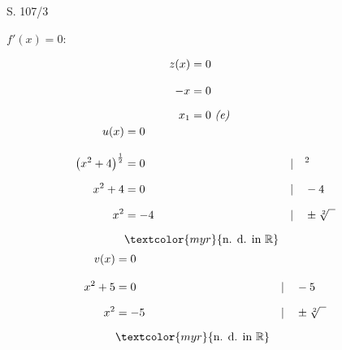 \begin{Exercise}{S. 107/3}{}
\begin{enumerate}
\begin{enumerate}[label=\alph*),leftmargin=*]
{\begin{itemize}[leftmargin=*]
{                    $f'(x) = 0:$\\
                    \begin{minipage}[t]{0.20\linewidth}
                        \vspace{-2.0ex}
                        \begin{align*}
                            z(x) &= 0 \\[2.0ex]
                            -x &= 0 &&\\[1.5ex]
                            x_{1} &= 0 \ \text{\textit{(e)}}&&\\[-2.0ex]
                        \end{align*}
                    \end{minipage}
                    \hfill
                    \begin{minipage}[t]{0.35\linewidth}
                        \vspace{-2.0ex}
                        \begin{align*}
                            u(x) &= 0 \\[2.0ex]
                            \left(x^{2} + 4\right)^{\frac{1}{2}} &= 0 &&| \quad ^{2}\\[1.5ex]
                            x^{2} + 4 &= 0 &&| \quad - 4\\[1.5ex]
                            x^{2} &= -4 &&| \quad \pm \sqrt[2]{\phantom{x}}\\[1.5ex]
                            & \textcolor{myr}{\text{n. d. in } \mathbb{R}}\\[-1.5ex]
                        \end{align*}
                    \end{minipage}
                    \hfill
                    \begin{minipage}[t]{0.25\linewidth}
                        \vspace{-2.0ex}
                        \begin{align*}
                            v(x) &= 0 \\[2.0ex]
                            x^{2} + 5 &= 0 &&| \quad -5\\[1.5ex]
                            x^{2} &= -5 &&| \quad \pm \sqrt[2]{\phantom{x}}\\[1.5ex]
                            & \textcolor{myr}{\text{n. d. in } \mathbb{R}}\\[-1.5ex]
                        \end{align*}
                    \end{minipage}
}
\end{itemize}}
\end{enumerate}
\end{enumerate}
\end{Exercise}
